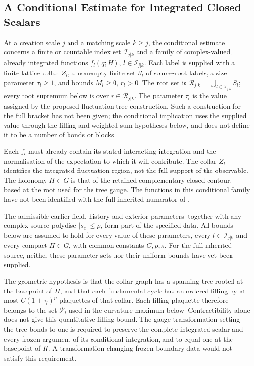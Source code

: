 \documentclass[11pt]{preprint}
\numberwithin{equation}{section}
\begin{document}
\subsection{A Conditional Estimate for Integrated Closed Scalars}

At a creation scale $j$ and a matching scale $k \geqslant j$, the conditional estimate concerns a finite or countable index set $\mathcal I_{j|k}$ and a family of complex-valued, already integrated functions $f_l(q;H)$, $l \in \mathcal I_{j|k}$. Each label is supplied with a finite lattice collar $Z_l$, a nonempty finite set $S_l$ of source-root labels, a size parameter $\tau_l \geq 1$, and bounds $M_l \geq 0$, $r_l>0$. The root set is $\mathcal R_{j|k}=\bigcup _{l \in \mathcal I_{j|k}}S_l$; every root supremum below is over $r \in \mathcal R_{j|k}$. The parameter $\tau_l$ is the value assigned by the proposed fluctuation-tree construction. Such a construction for the full bracket has not been given; the conditional implication uses the supplied value through the filling and weighted-sum hypotheses below, and does not define it to be a number of bonds or blocks.

Each $f_l$ must already contain its stated interacting integration and the normalisation of the expectation to which it will contribute. The collar $Z_l$ identifies the integrated fluctuation region, not the full support of the observable. The holonomy $H \in G$ is that of the retained complementary closed contour, based at the root used for the tree gauge. The functions in this conditional family have not been identified with the full inherited numerator of .

The admissible earlier-field, history and exterior parameters, together with any complex source polydisc $|s_c| \leqslant \rho$, form part of the specified data. All bounds below are assumed to hold for every value of these parameters, every $l \in \mathcal I_{j|k}$ and every compact $H \in G$, with common constants $C,p,\kappa$. For the full inherited source, neither these parameter sets nor their uniform bounds have yet been supplied.

The geometric hypothesis is that the collar graph has a spanning tree rooted at the basepoint of $H$, and that each fundamental cycle has an ordered filling by at most $C(1+\tau_l)^p$ plaquettes of that collar. Each filling plaquette therefore belongs to the set $\mathcal P_l$ used in the curvature maximum below. Contractibility alone does not give this quantitative filling bound. The gauge transformation setting the tree bonds to one is required to preserve the complete integrated scalar and every frozen argument of its conditional integration, and to equal one at the basepoint of $H$. A transformation changing frozen boundary data would not satisfy this requirement.
\end{document}
